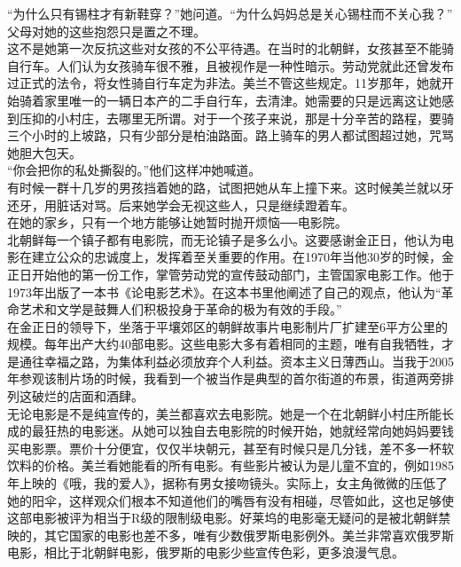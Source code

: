\begin{multicols}{\theparacolNo}
“为什么只有锡柱才有新鞋穿？”她问道。“为什么妈妈总是关心锡柱而不关心我？”\\

父母对她的这些抱怨只是置之不理。\\

这不是她第一次反抗这些对女孩的不公平待遇。在当时的北朝鲜，女孩甚至不能骑自行车。人们认为女孩骑车很不雅，且被视作是一种性暗示。劳动党就此还曾发布过正式的法令，将女性骑自行车定为非法。美兰不管这些规定。11岁那年，她就开始骑着家里唯一的一辆日本产的二手自行车，去清津。她需要的只是远离这让她感到压抑的小村庄，去哪里无所谓。对于一个孩子来说，那是十分辛苦的路程，要骑三个小时的上坡路，只有少部分是柏油路面。路上骑车的男人都试图超过她，咒骂她胆大包天。\\

“你会把你的私处撕裂的。”他们这样冲她喊道。\\

有时候一群十几岁的男孩挡着她的路，试图把她从车上撞下来。这时候美兰就以牙还牙，用脏话对骂。后来她学会无视这些人，只是继续蹬着车。\\

在她的家乡，只有一个地方能够让她暂时抛开烦恼──电影院。\\

北朝鲜每一个镇子都有电影院，而无论镇子是多么小。这要感谢金正日，他认为电影在建立公众的忠诚度上，发挥着至关重要的作用。在1970年当他30岁的时候，金正日开始他的第一份工作，掌管劳动党的宣传鼓动部门，主管国家电影工作。他于1973年出版了一本书《论电影艺术》。在这本书里他阐述了自己的观点，他认为“革命艺术和文学是鼓舞人们积极投身于革命的极为有效的手段。”\\

在金正日的领导下，坐落于平壤郊区的朝鲜故事片电影制片厂扩建至6平方公里的规模。每年出产大约40部电影。这些电影大多有着相同的主题，唯有自我牺牲，才是通往幸福之路，为集体利益必须放弃个人利益。资本主义日薄西山。当我于2005年参观该制片场的时候，我看到一个被当作是典型的首尔街道的布景，街道两旁排列这破烂的店面和酒肆。\\

无论电影是不是纯宣传的，美兰都喜欢去电影院。她是一个在北朝鲜小村庄所能长成的最狂热的电影迷。从她可以独自去电影院的时候开始，她就经常向她妈妈要钱买电影票。票价十分便宜，仅仅半块朝元，甚至有时候只是几分钱，差不多一杯软饮料的价格。美兰看她能看的所有电影。有些影片被认为是儿童不宜的，例如1985年上映的《哦，我的爱人》，据称有男女接吻镜头。实际上，女主角微微的压低了她的阳伞，这样观众们根本不知道他们的嘴唇有没有相碰，尽管如此，这也足够使这部电影被评为相当于R级的限制级电影。好莱坞的电影毫无疑问的是被北朝鲜禁映的，其它国家的电影也差不多，唯有少数俄罗斯电影例外。美兰非常喜欢俄罗斯电影，相比于北朝鲜电影，俄罗斯的电影少些宣传色彩，更多浪漫气息。\\


\end{multicols}
